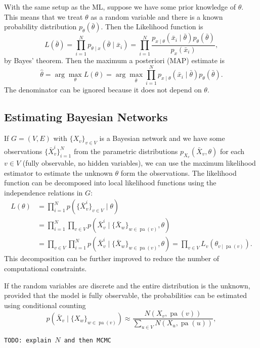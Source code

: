 \documentclass[a4paper]{article}
\newcommand{\todo}[1]{\texttt{TODO: #1}}
\newcommand{\given}{\mid}
\DeclareMathOperator{\pa}{pa} %
\theoremstyle{plain}
\theoremstyle{definition}
\theoremstyle{remark}
\begin{document}
With the same setup as the ML, suppose we have some prior knowledge of
$\theta$. This means that we treat $\theta$ as a random variable and there is
a known probability distribution $p_\theta(\bar{\theta})$. Then the Likelihood
function is
\[
  L(\bar{\theta}) = \prod_{i=1}^N
    p_{\theta \given x}(\bar{\theta} \given \bar{x}_i)
    = \prod_{i=1}^N \frac{
        p_{x \given \theta}(\bar{x}_i \given \bar{\theta})
        p_\theta(\bar{\theta})
      }{p_x(\bar{x}_i)},
\]
by Bayes' theorem. Then the maximum a posteriori (MAP) estimate is
\[
  \hat{\theta} = \arg \max_\theta L(\theta)
    = \arg \max_{\bar{\theta}} \prod_{i=1}^N
        p_{x \given \theta}(\bar{x}_i \given \bar{\theta})
        p_\theta(\bar{\theta}).
\]
The denominator can be ignored because it does not depend on $\theta$.


\subsection{Estimating Bayesian Networks}

If $G = (V,E)$ with $\{X_v\}_{v \in V}$ is a Bayesian network and we have some
observations $\{\bar{X}_v^i\}_{i=1}^N$ from the parametric distributions
$p_{X_v}(\bar{X}_v, \theta)$ for each $v \in V$ (fully observable, no hidden
variables), we can use the maximum likelihood estimator to estimate the
unknown $\theta$ form the observations. The likelihood function can be
decomposed into local likelihood functions using the independence relations in
$G$:
\begin{align*}
  L(\theta) &= \prod_{i=1}^N p(\{\bar{X}_v^i\}_{v \in V} \given \theta) \\
    &= \prod_{i=1}^N \prod_{v \in V}  p(
      \bar{X}_v^i \given
      \{\bar{X}_w\}_{w \in \pa(v)}, \theta) \\
    &= \prod_{v \in V} \prod_{i=1}^N
        p(\bar{X}_v^i \given \{\bar{X}_w\}_{w \in \pa(v)}, \theta) 
    = \prod_{v \in V} L_v(\theta_{v \given \pa(v)}).
\end{align*}
This decomposition can be further improved to reduce the number of
computational constraints.

If the random variables are discrete and the entire distribution is the
unknown, provided that the model is fully observable, the probabilities can be
estimated using conditional counting
\[
  p(\bar{X}_v \given \{X_w\}_{w \in \pa(v)}) \approx
    \frac{N(X_v, \pa(v))}{\sum_{u \in V} N(X_u, \pa(u))},
\]

\todo{explain $N$ and then MCMC}
\end{document}
